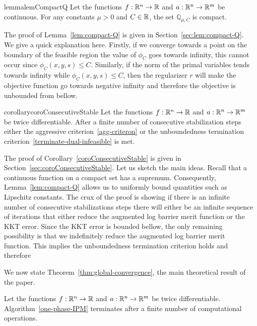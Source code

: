 \documentclass{article}
\begin{document}
\begin{restatable}{lemma}{lemCompactQ}\label{lem:compact-Q}
Let the functions $f : \mathbb{R}^{n} \rightarrow \mathbb{R}$ and $a : \mathbb{R}^{n} \rightarrow \mathbb{R}^{m}$ be continuous. For any constants $\mu > 0$ and $C \in \mathbb{R}$, the set $\mathbb{Q}_{\mu, C}$ is compact.
\end{restatable}

The proof of Lemma~\ref{lem:compact-Q} is given in Section~\ref{sec:lem:compact-Q}. We give a quick explanation here. Firstly, if we converge towards a point on the boundary of the feasible region the value of $\phi_{C}$ goes towards infinity, this cannot occur since $\phi_{C}(x, y, s) \le C$. Similarly, if the norm of the primal variables tends towards infinity while $\phi_{C}(x, y, s) \le C$, then the regularizer $r$ will make the objective function go towards negative infinity and therefore the objective is unbounded from bellow.

\begin{restatable}{corollary}{coroConsecutiveStable}\label{coroConsecutiveStable}
Let the functions $f : \mathbb{R}^{n} \rightarrow \mathbb{R}$ and $a : \mathbb{R}^{n} \rightarrow \mathbb{R}^{m}$ be twice differentiable.
After a finite number of consecutive stabilization steps either the aggressive criterion~\eqref{agg-criteron} or the unboundedness termination criterion~\eqref{terminate-dual-infeasible}  is met.
\end{restatable}

The proof of Corollary~\ref{coroConsecutiveStable} is given in Section~\ref{sec:coroConsecutiveStable}. Let us sketch the main ideas. Recall that a continuous function on a compact set has a supremum. Consequently, Lemma~\ref{lem:compact-Q} allows us to uniformly bound quantities such as Lipschitz constants. The crux of the proof is showing if there is an infinite number of consecutive stabilizations steps there will either be an infinite sequence of iterations that either reduce the augmented log barrier merit function or the KKT error. Since the KKT error is bounded bellow, the only remaining possibility is that we indefinitely reduce the augmented log barrier merit function. This implies the unboundedness termination criterion holds and therefore 

We now state Theorem~\ref{thm:global-convergence}, the main theoretical result of the paper.

\begin{theorem}\label{thm:global-convergence}
Let the functions $f : \mathbb{R}^{n} \rightarrow \mathbb{R}$ and $a : \mathbb{R}^{n} \rightarrow \mathbb{R}^{m}$ be twice differentiable.
Algorithm~\ref{one-phase-IPM} terminates after a finite number of computational operations.
\end{theorem}
\end{document}
